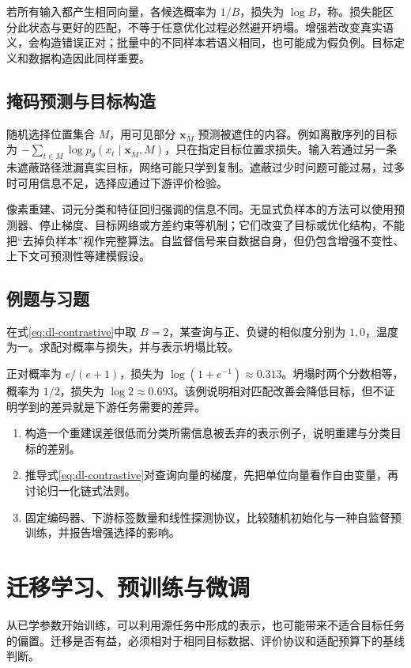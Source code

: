 \documentclass[UTF8,12pt,a4paper,fontset=fandol]{ctexbook}
\begin{document}
若所有输入都产生相同向量，各候选概率为 $1/B$，损失为 $\log B$，称。损失能区分此状态与更好的匹配，不等于任意优化过程必然避开坍塌。增强若改变真实语义，会构造错误正对；批量中的不同样本若语义相同，也可能成为假负例。目标定义和数据构造因此同样重要。

\section{掩码预测与目标构造}
随机选择位置集合 $M$，用可见部分 $\mathbf x_{\bar M}$ 预测被遮住的内容。例如离散序列的目标为 $-\sum_{t\in M}\log p_\theta(x_t\mid\mathbf x_{\bar M},M)$，只在指定目标位置求损失。输入若通过另一条未遮蔽路径泄漏真实目标，网络可能只学到复制。遮蔽过少时问题可能过易，过多时可用信息不足，选择应通过下游评价检验。

像素重建、词元分类和特征回归强调的信息不同。无显式负样本的方法可以使用预测器、停止梯度、目标网络或方差约束等机制；它们改变了目标或优化结构，不能把“去掉负样本”视作完整算法。自监督信号来自数据自身，但仍包含增强不变性、上下文可预测性等建模假设。

\section{例题与习题}
\begin{example}[温度化匹配]
在式\eqref{eq:dl-contrastive}中取 $B=2$，某查询与正、负键的相似度分别为 $1,0$，温度为一。求配对概率与损失，并与表示坍塌比较。
\end{example}
\begin{solve}
正对概率为 $e/(e+1)$，损失为 $\log(1+e^{-1})\approx0.313$。坍塌时两个分数相等，概率为 $1/2$，损失为 $\log2\approx0.693$。该例说明相对匹配改善会降低目标，但不证明学到的差异就是下游任务需要的差异。
\end{solve}
\begin{enumerate}
\item 构造一个重建误差很低而分类所需信息被丢弃的表示例子，说明重建与分类目标的差别。
\item 推导式\eqref{eq:dl-contrastive}对查询向量的梯度，先把单位向量看作自由变量，再讨论归一化链式法则。
\item 固定编码器、下游标签数量和线性探测协议，比较随机初始化与一种自监督预训练，并报告增强选择的影响。
\end{enumerate}

\chapter{迁移学习、预训练与微调}
\label{chap:dl-transfer}
从已学参数开始训练，可以利用源任务中形成的表示，也可能带来不适合目标任务的偏置。迁移是否有益，必须相对于相同目标数据、评价协议和适配预算下的基线判断。
\end{document}
